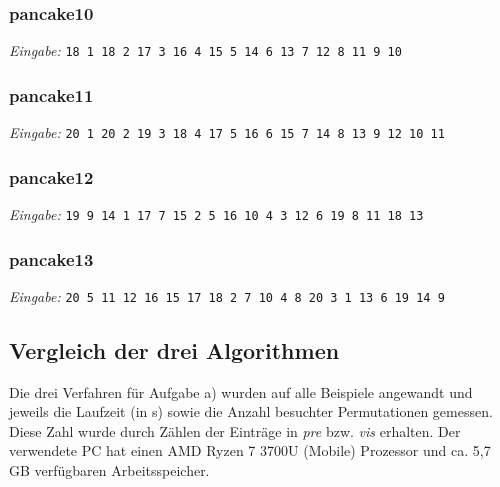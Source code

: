 \documentclass[a4paper, 10pt, ngerman]{article}
\begin{document}
\subsubsection{pancake10}
\scriptsize \emph{Eingabe: }\verb|18 1 18 2 17 3 16 4 15 5 14 6 13 7 12 8 11 9 10|
\normalsize


\subsubsection{pancake11}
\scriptsize \emph{Eingabe: }\verb|20 1 20 2 19 3 18 4 17 5 16 6 15 7 14 8 13 9 12 10 11|
\normalsize


\subsubsection{pancake12}
\scriptsize \emph{Eingabe: }\verb|19 9 14 1 17 7 15 2 5 16 10 4 3 12 6 19 8 11 18 13|
\normalsize


\subsubsection{pancake13}
\scriptsize \emph{Eingabe: }\verb|20 5 11 12 16 15 17 18 2 7 10 4 8 20 3 1 13 6 19 14 9|
\normalsize


\subsection{Vergleich der drei Algorithmen}

Die drei Verfahren für Aufgabe a) wurden auf alle Beispiele angewandt und jeweils die Laufzeit (in s) sowie die Anzahl besuchter Permutationen gemessen. Diese Zahl wurde durch Zählen der Einträge in \emph{pre} bzw. \emph{vis} erhalten. Der verwendete PC hat einen AMD Ryzen 7 3700U (Mobile) Prozessor und ca. 5,7 GB verfügbaren Arbeitsspeicher.
\end{document}
